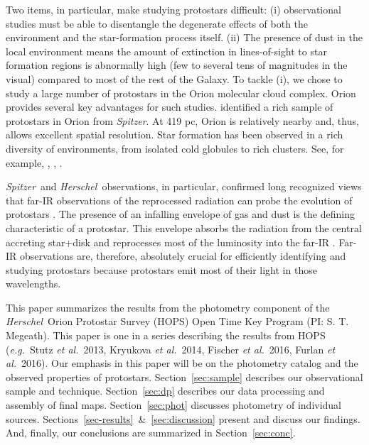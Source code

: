 \documentclass[manuscript]{aastex}
\newcommand{\etal}{{\em et al.}}
\newcommand{\eg}{{\em e.g.}}
\newcommand{\herschel}{{\em Herschel}}
\newcommand{\spitzer}{{\em Spitzer}}
\begin{document}
Two items, in particular, make studying protostars difficult:  (i) observational studies must be able to disentangle the degenerate effects of both the environment and the star-formation process itself.  (ii) The presence of dust in the local environment means the amount of extinction in lines-of-sight to star formation regions is abnormally high (few to several tens of magnitudes in the visual) compared to most of the rest of the Galaxy.  To tackle (i), we chose to study a large number of protostars in the Orion molecular cloud complex.  Orion provides several key advantages for such studies.  \cite{orion} identified a rich sample of protostars in Orion from \spitzer.  At 419 pc, Orion is relatively nearby \citep{schlafly} and, thus, allows excellent spatial resolution.  Star formation has been observed in a rich diversity of environments, from isolated cold globules to rich clusters. See, for example, \cite{carpenter}, \cite{feigelson}, \cite{amy2010}.
\par
\spitzer\ and \herschel\ observations, in particular, confirmed long recognized views that far-IR observations of the reprocessed radiation can probe the evolution of protostars \citep{als87}.  The presence of an infalling envelope of gas and dust is the defining characteristic of a protostar. This envelope absorbs the radiation from the central accreting star+disk and reprocesses most of the luminosity into the far-IR \citep{ali}.   Far-IR observations are, therefore, absolutely crucial for efficiently identifying and studying protostars because protostars emit most of their light in those wavelengths.
\par
This paper summarizes the results from the photometry component of the \herschel\ Orion Protostar Survey (HOPS) Open Time Key Program (PI: S. T. Megeath).  This paper is one in a series describing the results from HOPS (\eg\ Stutz \etal\ 2013, Kryukova \etal\ 2014, Fischer \etal\ 2016, Furlan \etal\ 2016).  Our emphasis in this paper will be on the photometry catalog and the observed properties of protostars.  Section~\ref{sec:sample} describes our observational sample and technique.  Section~\ref{sec:dp} describes our data processing and assembly of final maps.  Section~\ref{sec:phot} discusses photometry of individual sources.  Sections~\ref{sec-results}~\&~\ref{sec:discussion} present and discuss our findings.  And, finally, our conclusions are summarized in Section~\ref{sec:conc}.
\end{document}
